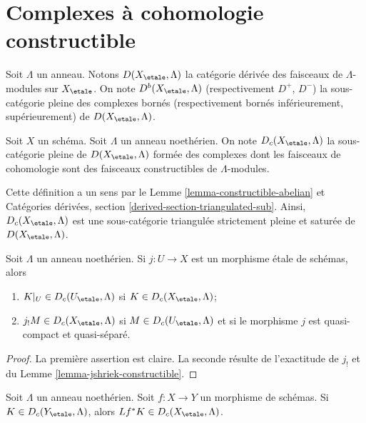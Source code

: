 \section{Complexes à cohomologie constructible}
\label{section-Dc}

\noindent
Soit $\Lambda$ un anneau. Notons $D(X_\etale, \Lambda)$ la catégorie dérivée
des faisceaux de $\Lambda$-modules sur $X_\etale$.
On note $D^b(X_\etale, \Lambda)$ (respectivement $D^+$, $D^-$)
la sous-catégorie pleine des complexes bornés (respectivement bornés inférieurement,
supérieurement) de $D(X_\etale, \Lambda)$.

\begin{definition}
\label{definition-c}
Soit $X$ un schéma. Soit $\Lambda$ un anneau noethérien.
On note {\it $D_c(X_\etale, \Lambda)$} la sous-catégorie pleine
de $D(X_\etale, \Lambda)$ formée des complexes dont les faisceaux de cohomologie
sont des faisceaux constructibles de $\Lambda$-modules.
\end{definition}

\noindent
Cette définition a un sens par le Lemme \ref{lemma-constructible-abelian} et
Catégories dérivées, section \ref{derived-section-triangulated-sub}.
Ainsi, $D_c(X_\etale, \Lambda)$ est une sous-catégorie triangulée strictement
pleine et saturée de $D(X_\etale, \Lambda)$.

\begin{lemma}
\label{lemma-restrict-and-shriek-from-etale-c}
Soit $\Lambda$ un anneau noethérien.
Si $j : U \to X$ est un morphisme étale de schémas, alors
\begin{enumerate}
\item $K|_U \in D_c(U_\etale, \Lambda)$ si $K \in D_c(X_\etale, \Lambda)$;
\item $j_!M \in D_c(X_\etale, \Lambda)$ si $M \in D_c(U_\etale, \Lambda)$ et si
le morphisme $j$ est quasi-compact et quasi-séparé.
\end{enumerate}
\end{lemma}

\begin{proof}
La première assertion est claire. La seconde résulte de l'exactitude
de $j_!$ et du Lemme \ref{lemma-jshriek-constructible}.
\end{proof}

\begin{lemma}
\label{lemma-pullback-c}
Soit $\Lambda$ un anneau noethérien.
Soit $f : X \to Y$ un morphisme de schémas. Si $K \in D_c(Y_\etale, \Lambda)$,
alors $Lf^*K \in D_c(X_\etale, \Lambda)$.
\end{lemma}

